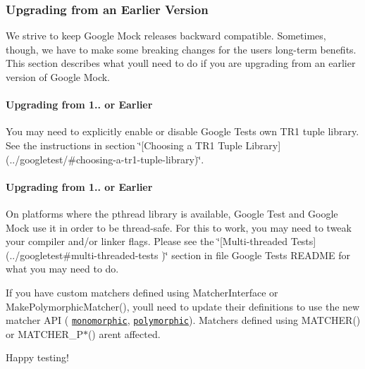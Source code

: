 \subsubsection*{Upgrading from an Earlier Version}

We strive to keep Google Mock releases backward compatible. Sometimes, though, we have to make some breaking changes for the users\textquotesingle{} long-\/term benefits. This section describes what you\textquotesingle{}ll need to do if you are upgrading from an earlier version of Google Mock.

\paragraph*{Upgrading from 1.. or Earlier}

You may need to explicitly enable or disable Google Test\textquotesingle{}s own T\+R1 tuple library. See the instructions in section \char`\"{}\mbox{[}\+Choosing a T\+R1 Tuple
\+Library\mbox{]}(../googletest/\#choosing-\/a-\/tr1-\/tuple-\/library)\char`\"{}.

\paragraph*{Upgrading from 1.. or Earlier}

On platforms where the pthread library is available, Google Test and Google Mock use it in order to be thread-\/safe. For this to work, you may need to tweak your compiler and/or linker flags. Please see the \char`\"{}\mbox{[}\+Multi-\/threaded Tests\mbox{]}(../googletest\#multi-\/threaded-\/tests
)\char`\"{} section in file Google Test\textquotesingle{}s R\+E\+A\+D\+ME for what you may need to do.

If you have custom matchers defined using {\ttfamily Matcher\+Interface} or {\ttfamily Make\+Polymorphic\+Matcher()}, you\textquotesingle{}ll need to update their definitions to use the new matcher A\+PI ( \href{./docs/CookBook.md#writing-new-monomorphic-matchers}{\tt monomorphic}, \href{./docs/CookBook.md#writing-new-polymorphic-matchers}{\tt polymorphic}). Matchers defined using {\ttfamily M\+A\+T\+C\+H\+E\+R()} or {\ttfamily M\+A\+T\+C\+H\+E\+R\+\_\+\+P$\ast$()} aren\textquotesingle{}t affected.

Happy testing! 